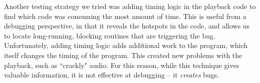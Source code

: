 \documentclass[12pt]{article}
\begin{document}
Another testing strategy we tried was adding timing logic in the playback code
to find which code was consuming the most amount of time.
This is useful from a debugging perspective, in that it reveals the hotspots in
the code, and allows us to locate long-running, blocking routines that are
triggering the bug.
Unfortunately, adding timing logic adds additional work to the program, which
itself changes the timing of the program.
This created new problems with the playback, such as ``crackly" audio.
For this reason, while this technique gives valuable information, it is not
effective at debugging -- it \emph{creates} bugs.






\end{document}
